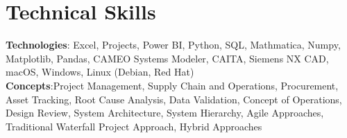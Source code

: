 \section{Technical Skills}
\begin{itemize}[leftmargin=0.15in, label={}]
	\small{\item{
		            \textbf{Technologies}{: Excel, Projects, Power BI, Python, SQL, Mathmatica, Numpy, Matplotlib, Pandas, CAMEO Systems Modeler, CAITA, Siemens NX CAD, macOS, Windows, Linux (Debian, Red Hat)} \\
		            \textbf{Concepts}{:Project Management, Supply Chain and Operations, Procurement, Asset Tracking, Root Cause Analysis, Data Validation, Concept of Operations, Design Review, System Architecture, System Hierarchy, Agile Approaches, Traditional Waterfall Project Approach, Hybrid Approaches }
		      }}
\end{itemize}
